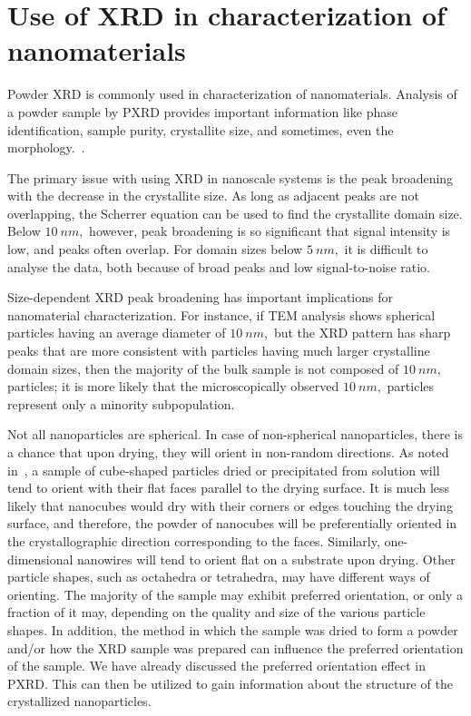 \section{Use of XRD in characterization of nanomaterials}

Powder XRD is commonly used in characterization of nanomaterials. Analysis of a powder sample by PXRD provides important information like phase identification, sample purity, crystallite size, and sometimes, even the morphology.~\cite{Holder2019}.

The primary issue with using XRD in nanoscale systems is the peak broadening with the decrease in the crystallite size. As long as adjacent peaks are not overlapping, the Scherrer equation can be used to find the crystallite domain size. Below $\SI{10}{nm},$ however, peak broadening is so significant that signal intensity is low, and peaks often overlap. For domain sizes below $\SI{5}{nm},$ it is difficult to analyse the data, both because of broad peaks and low signal-to-noise ratio.

Size-dependent XRD peak broadening has important implications for nanomaterial characterization. For instance, if TEM analysis shows spherical particles having an average diameter of $\SI{10}{nm},$ but the XRD pattern has sharp peaks that are more consistent with particles having much larger crystalline domain sizes, then the majority of the bulk sample is not composed of $\SI{10}{nm},$ particles; it is more likely that the microscopically observed $\SI{10}{nm},$ particles represent only a minority subpopulation.

Not all nanoparticles are spherical. In case of non-spherical nanoparticles, there is a chance that upon drying, they will orient in non-random directions. As noted in~\cite{Holder2019}, a sample of cube-shaped particles dried or precipitated from solution will tend to orient with their flat faces parallel to the drying surface. It is much less likely that nanocubes would dry with their corners or edges touching the drying surface, and therefore, the powder of nanocubes will be preferentially oriented in the crystallographic direction corresponding to the faces. Similarly, one-dimensional nanowires will tend to orient flat on a substrate upon drying. Other particle shapes, such as octahedra or tetrahedra, may have different ways of orienting. The majority of the sample may exhibit preferred orientation, or only a fraction of it may, depending on the quality and size of the various particle shapes. In addition, the method in which the sample was dried to form a powder and/or how the XRD sample was prepared can influence the preferred orientation of the sample. We have already discussed the preferred orientation effect in PXRD. This can then be utilized to gain information about the structure of the crystallized nanoparticles.

